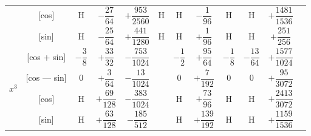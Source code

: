 \documentclass[11pt,a4paper]{book}
\begin{document}
\begin{center}
\begin{tabular}{|c|c|c|c|c|c|c|c|c|c|c|c|}
& [cos] & H & $-\dfrac{27}{64}$ & $+\dfrac{953}{2560}$ & H & H & $-\dfrac{1}{96}$ & H & H & $+\dfrac{1481}{1536}$ \\
& [sin] & H & $-\dfrac{25}{64}$ & $+\dfrac{441}{1280}$ & H & H & $+\dfrac{1}{96}$ & H & H & $+\dfrac{251}{256}$ \\
\hline
\multirow{4}{*}{$x^3$} & [cos + sin] & $-\dfrac{3}{8}$ & $+\dfrac{33}{32}$ & $-\dfrac{753}{1024}$ & & $-\dfrac{1}{2}$ & $+\dfrac{95}{64}$ & $-\dfrac{1}{8}$ & $-\dfrac{13}{64}$ & $+\dfrac{1577}{1024}$ \\
& [cos --- sin] & $0$ & $+\dfrac{3}{64}$ & $-\dfrac{13}{1024}$ & & $0$ & $+\dfrac{7}{192}$ & $0$ & $0$ & $+\dfrac{95}{3072}$ \\
& [cos] & H & $+\dfrac{69}{128}$ & $-\dfrac{383}{1024}$ & & H & $+\dfrac{73}{96}$ & H & H & $+\dfrac{2413}{3072}$ \\
& [sin] & H & $+\dfrac{63}{128}$ & $-\dfrac{185}{512}$ & & H & $+\dfrac{139}{192}$ & H & H & $+\dfrac{1159}{1536}$ \\
\hline
\end{tabular}
\end{center}

\newpage
{}
\end{document}
